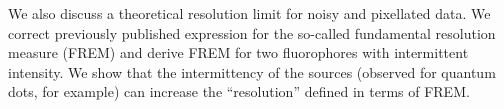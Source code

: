 \documentclass[11pt]{article}
\begin{document}
We also discuss a theoretical resolution limit for noisy and pixellated data. We correct previously published expression for the so-called fundamental resolution measure (FREM) and derive FREM for two fluorophores with intermittent intensity. We show that the intermittency of the sources (observed for quantum dots, for example) can increase the ``resolution'' defined in terms of FREM.
\end{document}
